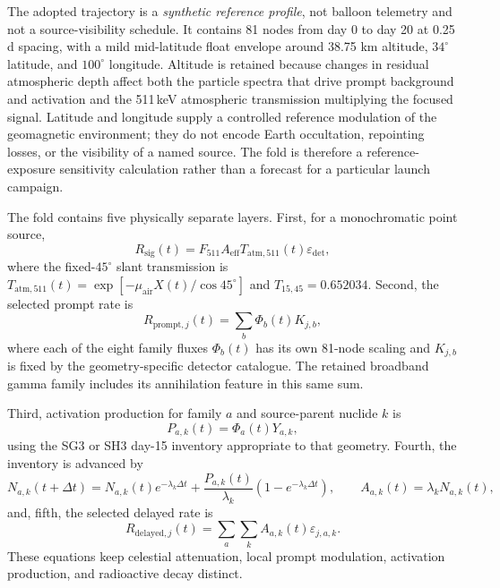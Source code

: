 \documentclass[11pt]{article}
\begin{document}
The adopted trajectory is a \emph{synthetic reference profile}, not balloon
telemetry and not a source-visibility schedule. It contains 81 nodes from day 0
to day 20 at 0.25 d spacing, with a mild mid-latitude float envelope around
38.75 km altitude, $34^\circ$ latitude, and $100^\circ$ longitude. Altitude is
retained because changes in residual atmospheric depth affect both the particle
spectra that drive prompt background and activation and the 511\,keV atmospheric
transmission multiplying the focused signal. Latitude and longitude supply a
controlled reference modulation of the geomagnetic environment; they do not
encode Earth occultation, repointing losses, or the visibility of a named source.
The fold is therefore a reference-exposure sensitivity calculation rather than a
forecast for a particular launch campaign.

The fold contains five physically separate layers. First, for a monochromatic
point source,
\begin{equation}
 R_{\mathrm{sig}}(t)=F_{511}A_{\mathrm{eff}}T_{\mathrm{atm},511}(t)
 \varepsilon_{\mathrm{det}},
 \label{eq:mission_signal}
\end{equation}
where the fixed-$45^\circ$ slant transmission is
$T_{\mathrm{atm},511}(t)=\exp[-\mu_{\mathrm{air}}X(t)/\cos45^\circ]$ and
$T_{15,45}=0.652034$. Second, the selected prompt rate is
\begin{equation}
 R_{\mathrm{prompt},j}(t)=\sum_b\Phi_b(t)K_{j,b},
 \label{eq:prompt_source_response}
\end{equation}
where each of the eight family fluxes $\Phi_b(t)$ has its own 81-node scaling and
$K_{j,b}$ is fixed by the geometry-specific detector catalogue. The retained
broadband gamma family includes its annihilation feature in this same sum.

Third, activation production for family $a$ and source-parent nuclide $k$ is
\begin{equation}
 P_{a,k}(t)=\Phi_a(t)Y_{a,k},
 \label{eq:activation_production}
\end{equation}
using the SG3 or SH3 day-15 inventory appropriate to that geometry. Fourth, the
inventory is advanced by
\begin{equation}
 N_{a,k}(t+\Delta t)=N_{a,k}(t)e^{-\lambda_k\Delta t}+
 \frac{P_{a,k}(t)}{\lambda_k}\left(1-e^{-\lambda_k\Delta t}\right),\qquad
 A_{a,k}(t)=\lambda_kN_{a,k}(t),
 \label{eq:delayed_inventory}
\end{equation}
and, fifth, the selected delayed rate is
\begin{equation}
 R_{\mathrm{delayed},j}(t)=\sum_a\sum_kA_{a,k}(t)\varepsilon_{j,a,k}.
 \label{eq:delayed_selected}
\end{equation}
These equations keep celestial attenuation, local prompt modulation, activation
production, and radioactive decay distinct.
\end{document}
